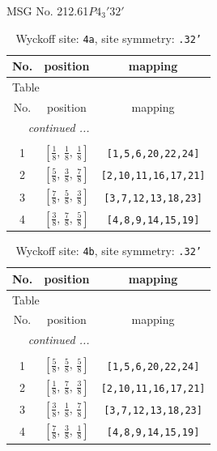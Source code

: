 \documentclass[fleqn,8pt]{jsarticle}
\begin{document}
\setcounter{MaxMatrixCols}{32}

\renewcommand{\tablename}{Table~}
\renewcommand{\figurename}{Figure~}
\begin{center}
\LARGE
MSG No. 212.61\quad$P4_{3}'32'$
\end{center}
\renewcommand{\arraystretch}{1.2}
\begin{longtable}{ccc}
\caption{Wyckoff site: {\tt 4a}, site symmetry: {\tt .32'}}
 \\
 \hline \hline
No. & position & mapping \\ \hline \endfirsthead

\multicolumn{2}{l}{\tablename\ \thetable{}} \\
 \hline \hline
No. & position & mapping \\ \hline \endhead

 \hline \hline
\multicolumn{2}{r}{\footnotesize\it continued ...} \\ \endfoot

 \hline \hline
\multicolumn{2}{r}{} \\ \endlastfoot

1 & $\left[ \frac{1}{8},\, \frac{1}{8},\, \frac{1}{8} \right]$ & {\tt [1,5,6,20,22,24]} \\ \hline
2 & $\left[ \frac{5}{8},\, \frac{3}{8},\, \frac{7}{8} \right]$ & {\tt [2,10,11,16,17,21]} \\ \hline
3 & $\left[ \frac{7}{8},\, \frac{5}{8},\, \frac{3}{8} \right]$ & {\tt [3,7,12,13,18,23]} \\ \hline
4 & $\left[ \frac{3}{8},\, \frac{7}{8},\, \frac{5}{8} \right]$ & {\tt [4,8,9,14,15,19]} \\
\end{longtable}
\renewcommand{\arraystretch}{1.2}
\begin{longtable}{ccc}
\caption{Wyckoff site: {\tt 4b}, site symmetry: {\tt .32'}}
 \\
 \hline \hline
No. & position & mapping \\ \hline \endfirsthead

\multicolumn{2}{l}{\tablename\ \thetable{}} \\
 \hline \hline
No. & position & mapping \\ \hline \endhead

 \hline \hline
\multicolumn{2}{r}{\footnotesize\it continued ...} \\ \endfoot

 \hline \hline
\multicolumn{2}{r}{} \\ \endlastfoot

1 & $\left[ \frac{5}{8},\, \frac{5}{8},\, \frac{5}{8} \right]$ & {\tt [1,5,6,20,22,24]} \\ \hline
2 & $\left[ \frac{1}{8},\, \frac{7}{8},\, \frac{3}{8} \right]$ & {\tt [2,10,11,16,17,21]} \\ \hline
3 & $\left[ \frac{3}{8},\, \frac{1}{8},\, \frac{7}{8} \right]$ & {\tt [3,7,12,13,18,23]} \\ \hline
4 & $\left[ \frac{7}{8},\, \frac{3}{8},\, \frac{1}{8} \right]$ & {\tt [4,8,9,14,15,19]} \\
\end{longtable}
\end{document}
